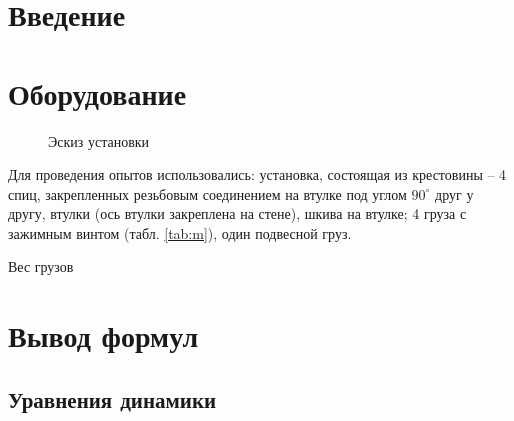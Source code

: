 \documentclass[a4paper,12pt]{article}
\begin{document}


\tableofcontents
\newpage

\section*{Введение} %
\label{sec:input}


\section{Оборудование} %
\label{sec:device}


\begin{figure}[H]
	\centering
	
	\caption{Эскиз установки}
	\label{fig:device}
\end{figure}


Для проведения опытов использовались: установка, состоящая из крестовины -- 4 спиц, закрепленных резьбовым соединением на втулке под углом $90^\circ$ друг у другу, втулки (ось втулки закреплена на стене), шкива на втулке; 4 груза с зажимным винтом (табл. \ref{tab:m}), один подвесной груз.


\begin{table}[H]
	\caption{Вес грузов}
	\label{tab:m}
	\centering
	\pgfplotstabletypeset{\loadedtable}
\end{table}

\section{Вывод формул} %
\label{sec:the}

\begin{figure}[H]
	\begin{minipage}[h]{0.49\linewidth}
	\centering
		
	\end{minipage}
	\hfill 
	\begin{minipage}[h]{0.49\linewidth}
	\centering
		
	\end{minipage}
\end{figure}

\subsection{Уравнения динамики} %
\end{document}
